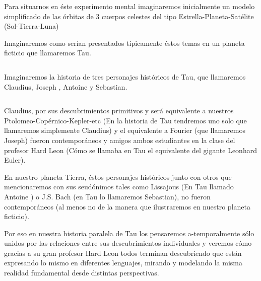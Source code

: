 \documentclass[preview]{standalone}
\begin{document}
\begin{center}
Para situarnos en éste experimento mental imaginaremos inicialmente un modelo simplificado de las órbitas de 3 cuerpos celestes del tipo Estrella-Planeta-Satélite (Sol-Tierra-Luna) 

$$ $$
Imaginaremos como serían presentados típicamente éstos temas en un planeta ficticio que llamaremos Tau. 

$$ $$ 

Imaginaremos la historia de tres personajes históricos de Tau, que llamaremos Claudius, Joseph , Antoine y Sebastian. 

$$ $$ 

Claudius, por sus descubrimientos primitivos y será equivalente a nuestros Ptolomeo-Copérnico-Kepler-etc (En la historia de Tau tendremos uno solo que llamaremos simplemente Claudius) y el equivalente a Fourier (que llamaremos Joseph) fueron contemporáneos y amigos ambos estudiantes en la clase del profesor Hard Leon  (Cómo se llamaba en Tau el equivalente del gigante Leonhard Euler). 

En nuestro planeta Tierra, éstos personajes históricos junto con otros que mencionaremos con sus seudónimos  tales como Lissajous (En Tau llamado Antoine ) o J.S. Bach (en Tau lo llamaremos Sebastian), no fueron  contemporáneos (al menos no de la manera que ilustraremos en nuestro planeta ficticio). 

Por eso en nuestra historia paralela de Tau los pensaremos a-temporalmente sólo unidos por las relaciones entre sus descubrimientos individuales  y veremos cómo gracias a su gran profesor Hard Leon todos terminan descubriendo que están expresando lo mismo en diferentes lenguajes, mirando  y modelando la misma realidad fundamental desde distintas perspectivas.
\end{center}
\end{document}
